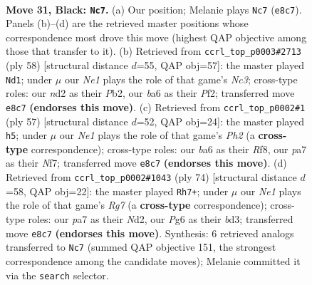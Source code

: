 \documentclass[11pt]{article}
\begin{document}
\clearpage

\begin{figure}[p]\centering
\begin{subfigure}{0.46\textwidth}\centering
\resizebox{\linewidth}{!}{%
\newchessgame
\chessboard[
  setfen={r3n3/P4kb1/Bp4p1/2p5/6pP/R7/3NR2K/2r5 b - - 1 31},
  showmover=false,
  pgfstyle=straightmove, color=movearrow, markmove={e8-c7}
]}
\caption{}
\end{subfigure}\hfill
\begin{subfigure}{0.46\textwidth}\centering
\resizebox{\linewidth}{!}{%
\newchessgame
\chessboard[
  setfen={2r3k1/4Rpb1/3p2p1/n7/8/2N5/1P2BPPP/6K1 w - - 1 30},
  showmover=false,
  pgfstyle=straightmove, color=movearrow, markmove={c3-d1}
]}
\caption{}
\end{subfigure}
\\[4pt]
\begin{subfigure}{0.46\textwidth}\centering
\resizebox{\linewidth}{!}{%
\newchessgame
\chessboard[
  setfen={5rk1/3R1npp/8/2pNp3/2P4P/r5P1/8/5RK1 b - - 3 29},
  showmover=false,
  pgfstyle=straightmove, color=movearrow, markmove={h7-h5}
]}
\caption{}
\end{subfigure}\hfill
\begin{subfigure}{0.46\textwidth}\centering
\resizebox{\linewidth}{!}{%
\newchessgame
\chessboard[
  setfen={1r5k/3R2R1/5pp1/8/1n3P2/3b1BP1/r2N2KP/8 w - - 1 38},
  showmover=false,
  pgfstyle=straightmove, color=movearrow, markmove={g7-h7}
]}
\caption{}
\end{subfigure}
\caption{\textbf{Move 31, Black: \texttt{Nc7}.} (a) Our position; Melanie plays \texttt{Nc7} (\texttt{e8c7}). Panels (b)--(d) are the retrieved master positions whose correspondence most drove this move (highest QAP objective among those that transfer to it). (b) Retrieved from \texttt{ccrl\_top\_p0003\#2713} (ply 58) [structural distance $d$=55, QAP obj=57]: the master played \texttt{Nd1}; under $\mu$ our \emph{Ne1} plays the role of that game's \emph{Nc3}; cross-type roles: our \emph{n}d2 as their \emph{P}b2, our \emph{b}a6 as their \emph{P}f2; transferred move \texttt{e8c7} \textbf{(endorses this move)}. (c) Retrieved from \texttt{ccrl\_top\_p0002\#1} (ply 57) [structural distance $d$=52, QAP obj=24]: the master played \texttt{h5}; under $\mu$ our \emph{Ne1} plays the role of that game's \emph{Ph2} (a \textbf{cross-type} correspondence); cross-type roles: our \emph{b}a6 as their \emph{R}f8, our \emph{p}a7 as their \emph{N}f7; transferred move \texttt{e8c7} \textbf{(endorses this move)}. (d) Retrieved from \texttt{ccrl\_top\_p0002\#1043} (ply 74) [structural distance $d$=58, QAP obj=22]: the master played \texttt{Rh7+}; under $\mu$ our \emph{Ne1} plays the role of that game's \emph{Rg7} (a \textbf{cross-type} correspondence); cross-type roles: our \emph{p}a7 as their \emph{N}d2, our \emph{P}g6 as their \emph{b}d3; transferred move \texttt{e8c7} \textbf{(endorses this move)}. Synthesis: 6 retrieved analogs transferred to \texttt{Nc7} (summed QAP objective 151, the strongest correspondence among the candidate moves); Melanie committed it via the \texttt{search} selector.}
\label{fig:thought-m61}
\end{figure}
\end{document}
